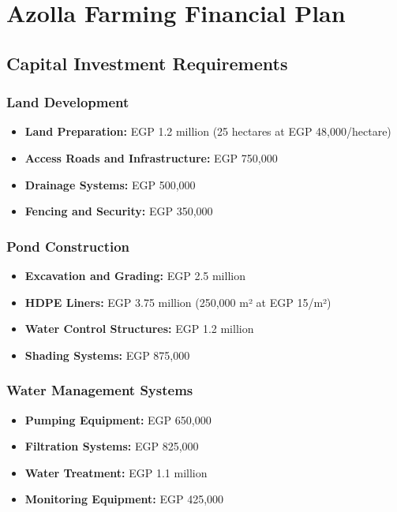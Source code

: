 \section{Azolla Farming Financial Plan}

\subsection{Capital Investment Requirements}

\subsubsection{Land Development}
\begin{itemize}
    \item \textbf{Land Preparation:} EGP 1.2 million (25 hectares at EGP 48,000/hectare)
    \item \textbf{Access Roads and Infrastructure:} EGP 750,000
    \item \textbf{Drainage Systems:} EGP 500,000
    \item \textbf{Fencing and Security:} EGP 350,000
\end{itemize}

\subsubsection{Pond Construction}
\begin{itemize}
    \item \textbf{Excavation and Grading:} EGP 2.5 million
    \item \textbf{HDPE Liners:} EGP 3.75 million (250,000 m² at EGP 15/m²)
    \item \textbf{Water Control Structures:} EGP 1.2 million
    \item \textbf{Shading Systems:} EGP 875,000
\end{itemize}

\subsubsection{Water Management Systems}
\begin{itemize}
    \item \textbf{Pumping Equipment:} EGP 650,000
    \item \textbf{Filtration Systems:} EGP 825,000
    \item \textbf{Water Treatment:} EGP 1.1 million
    \item \textbf{Monitoring Equipment:} EGP 425,000
\end{itemize}

